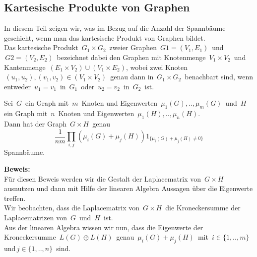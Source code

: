 \subsection{Kartesische Produkte von Graphen}
In diesem Teil zeigen wir, was im Bezug auf die Anzahl der Spannbäume geschieht, wenn man das kartesische Produkt von Graphen bildet.\\
Das kartesische Produkt $\,G_1\times G_2\,$ zweier Graphen $\,G1=(V_1,E_1)\,$ und $\,G2=(V_2,E_2)\,$ bezeichnet dabei den Graphen mit Knotenmenge $\,V_1\times V_2\,$ und Kantenmenge $\,(E_1\times V_2)\cup(V_1\times E_2)$,\; wobei zwei Knoten $\,(u_1,u_2), (v_1,v_2) \in (V_1\times V_2)\,$ genau dann in $\,G_1\times G_2\,$ benachbart sind, wenn entweder $\,u_1=v_1\,$ in $\,G_1\,$ oder $\,u_2=v_2\,$ in $\,G_2\,$ ist.\\
\begin{Tms}
 Sei $\,G\,$ ein Graph mit $\,m\,$ Knoten und Eigenwerten $\,\mu_1(G),..,\mu_m(G)\,$ und $\,H\,$ ein Graph mit $\,n\,$ Knoten und Eigenwerten $\,\mu_1(H),..,\mu_n(H)$.\;  \\
Dann hat der Graph $\,G \times H\,$ genau
\begin{equation}
\frac{1}{nm}\displaystyle\prod_{i,j}(\mu_i(G)+\mu_j(H))1_{\{\mu_i(G)+\mu_j(H)\neq0\}}
\end{equation}
Spannbäume.
\label{tmcpG}
\end{Tms}
\textbf{Beweis:}\\
Für diesen Beweis werden wir die Gestalt der Laplacematrix von $\,G \times H\,$ ausnutzen und dann mit Hilfe der linearen Algebra Aussagen über die Eigenwerte treffen.\\
Wir beobachten, dass die Laplacematrix von $\,G\times H\,$ die Kroneckersumme der Laplacematrizen von $\,G\,$ und $\,H\,$ ist.\\
Aus der linearen Algebra wissen wir nun, dass die Eigenwerte der Kroneckersumme $\,L(G) \oplus L(H)\,$ genau $\,\mu_i(G)+\mu_j(H)\,$ mit $\,i \in \{ 1,..,m\}\,$ und$\, j \in \{ 1,..,n\}\,$ sind.\\
